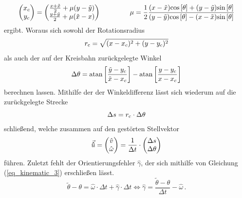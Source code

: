 \begin{equation}
\begin{pmatrix}
x_c \\ y_c
\end{pmatrix} = \begin{pmatrix}
\frac{x+\tilde{x}}{2} + \mu (y-\tilde{y})\\ \frac{y+\tilde{y}}{2}+\mu(\tilde{x}-x)
\end{pmatrix} \hspace{1.5cm}
\mu = \frac{1}{2}\frac{(x-\tilde{x})\text{cos}\left[ {\theta} \right] + (y-\tilde{y})\text{sin}\left[ {\theta} \right]}{(y-\tilde{y})\text{cos}\left[ {\theta} \right]-(x-\tilde{x})\text{sin}\left[ {\theta} \right]}
\end{equation}
ergibt. Woraus sich sowohl der Rotationsradius
\begin{equation}
r_{\text{c}} = \sqrt{(x-x_c)^2+(y-y_c)^2}
\end{equation}
als auch der auf der Kreisbahn zurückgelegte Winkel 
\begin{equation}
\Delta \theta = \text{atan}\left[ {\frac{\tilde{y}-y_c}{\tilde{x}-x_c}} \right]-\text{atan}\left[ {\frac{y-y_c}{x-x_c}} \right]
\end{equation}
berechnen lassen. Mithilfe der der Winkeldifferenz lässt sich wiederum auf die zurückgelegte Strecke
\begin{equation}
\Delta s = r_{\text{c}}\cdot \Delta \theta
\end{equation}
schließend, welche zusammen auf den gestörten Stellvektor
\begin{equation}
\vec{\mathbf{\hat{u}}} = \begin{pmatrix}
\hat{v}\\ \hat{\omega}
\end{pmatrix} = \frac{1}{\Delta t}\cdot \begin{pmatrix}
\Delta s\\ \Delta \theta
\end{pmatrix}
\end{equation}
führen. Zuletzt fehlt der Orientierungsfehler $\hat{\gamma}$, der sich mithilfe von Gleichung (\ref{eq_kinematic_3}) erschließen lässt.
\begin{equation}
\tilde{\theta}-\theta = \hat{\omega}\cdot \Delta t + \hat{\gamma}\cdot \Delta t
\Leftrightarrow
\hat{\gamma} = \frac{\tilde{\theta}-\theta}{\Delta t} - \hat{\omega}\,.
\end{equation}
